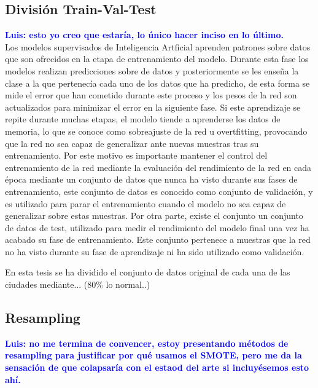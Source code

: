 \documentclass{uathesis-es}
\begin{document}
\subsection{División Train-Val-Test}

\textcolor{blue}{\textbf{Luis: esto yo creo que estaría, lo único hacer inciso en lo último.}}\\

Los modelos supervisados de Inteligencia Artficial aprenden patrones sobre datos que son ofrecidos en la etapa de entrenamiento del modelo. Durante esta fase los modelos realizan predicciones sobre de datos y posteriormente se les enseña la clase a la que pertenecía cada uno de los datos que ha predicho, de esta forma se mide el error que han cometido durante este proceso y los pesos de la red son actualizados para minimizar el error en la siguiente fase. Si este aprendizaje se repite durante muchas etapas, el modelo tiende a aprenderse los datos de memoria, lo que se conoce como sobreajuste de la red u overtfitting, provocando que la red no sea capaz de generalizar ante nuevas muestras tras su entrenamiento. Por este motivo es importante mantener el control del entrenamiento de la red mediante la evaluación del rendimiento de la red en cada época mediante un conjunto de datos que nunca ha visto durante sus fases de entrenamiento, este conjunto de datos es conocido como conjunto de validación, y es utilizado para parar el entrenamiento cuando el modelo no sea capaz de generalizar sobre estas muestras. Por otra parte, existe el conjunto un conjunto de datos de test, utilizado para medir el rendimiento del modelo final una vez ha acabado su fase de entrenamiento. Este conjunto pertenece a muestras que la red no ha visto durante su fase de aprendizaje ni ha sido utilizado como validación.

En esta tesis se ha dividido el conjunto de datos original de cada una de las ciudades mediante... (80\% lo normal..)

\subsection{Resampling}

\textcolor{blue}{\textbf{Luis: no me termina de convencer, estoy presentando métodos de resampling para justificar por qué usamos el SMOTE, pero me da la sensación de que colapsaría con el estaod del arte si incluyésemos esto ahí.}}\\
\end{document}
